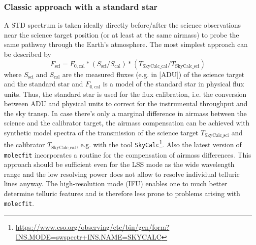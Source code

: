 \subsubsection{Classic approach with a standard star}\label{sssec:tecllcorrclassic}
A \ac{STD} spectrum is taken ideally directly before/after the science observations near the science target position (or at least at the same airmass) to probe the same pathway through the Earth's atmosphere. The most simplest approach can be described by
\begin{equation}
    F_\textrm{sci}=F_{0,\textrm{cal}}*\left(S_\textrm{sci}/S_\textrm{cal}\right)*\left(T_\textrm{SkyCalc\_cal} / T_\textrm{SkyCalc\_sci}\right)
\end{equation}
where $S_\textrm{sci}$ and $S_\textrm{cal}$ are the measured fluxes (e.g. in [\ac{ADU}]) of the science target and the standard star and $F_{0,\textrm{cal}}$ is a model of the standard star in physical flux units. Thus, the standard star is used for the flux calibration, i.e. the conversion between \ac{ADU} and physical units to correct for the instrumental throughput and the sky transp. In case there's only a marginal difference in airmass between the science and the calibrator target, the airmass compensation can be achieved with synthetic model spectra of the transmission of the science target $T_\textrm{SkyCalc\_sci}$ and the calibrator $T_\textrm{SkyCalc\_cal}$, e.g. with the tool \texttt{SkyCalc}\footnote{\url{https://www.eso.org/observing/etc/bin/gen/form?INS.MODE=swspectr+INS.NAME=SKYCALC}}. Also the latest version of \texttt{molecfit} incorporates a routine for the compensation of airmass differences. This approach should be sufficient even for the \ac{LSS} mode as the wide wavelength range and the low resolving power does not allow to resolve individual telluric lines anyway. The high-resolution mode (\ac{IFU}) enables one to much better determine telluric features and is therefore less prone to problems arising with \texttt{molecfit}.\\
